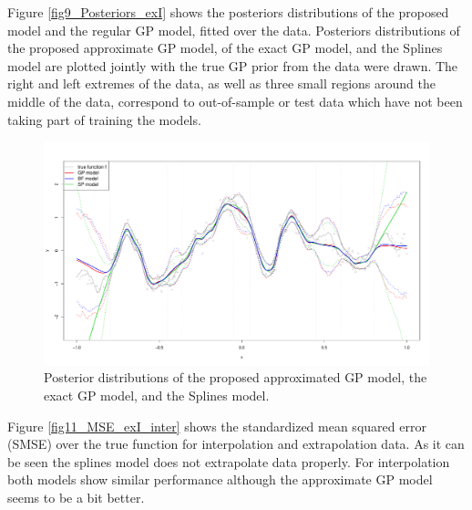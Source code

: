 \documentclass[]{interact}
\theoremstyle{plain}%
\theoremstyle{definition}
\theoremstyle{remark}
\begin{document}
Figure \ref{fig9_Posteriors_exI} shows the posteriors distributions of the proposed model and the regular GP model, fitted over the data. Posteriors distributions of the proposed approximate GP model, of the exact GP model, and the Splines model are plotted jointly with the true GP prior from the data were drawn. The right and left extremes of the data, as well as three small regions around the middle of the data, correspond to out-of-sample or test data which have not been taking part of training the models. 

\begin{figure}[H]
\centering
\includegraphics[scale=0.35]{fig10_Posteriors_exI.pdf}
\caption{Posterior distributions of the proposed approximated GP model, the exact GP model, and the Splines model.}
  \label{fig10_Posteriors_exI}
\end{figure}

Figure \ref{fig11_MSE_exI_inter} shows the  standardized mean squared error (SMSE) over the true function for interpolation and extrapolation data. As it can be seen the splines model does not extrapolate data properly. For interpolation both models show similar performance although the approximate GP model seems to be a bit better.
\end{document}
